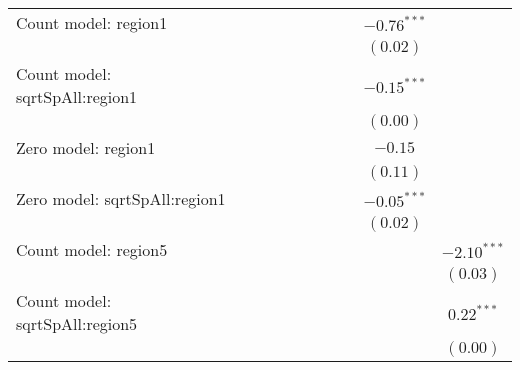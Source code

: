 \begin{center}
\begin{longtable}{l c c c c c c c c c}
Count model: region1           &               &               &               &                 &               &                 &                 & $-0.76^{***}$ &               \\
                               &               &               &               &                 &               &                 &                 & $(0.02)$      &               \\
Count model: sqrtSpAll:region1 &               &               &               &                 &               &                 &                 & $-0.15^{***}$ &               \\
                               &               &               &               &                 &               &                 &                 & $(0.00)$      &               \\
Zero model: region1            &               &               &               &                 &               &                 &                 & $-0.15$       &               \\
                               &               &               &               &                 &               &                 &                 & $(0.11)$      &               \\
Zero model: sqrtSpAll:region1  &               &               &               &                 &               &                 &                 & $-0.05^{***}$ &               \\
                               &               &               &               &                 &               &                 &                 & $(0.02)$      &               \\
Count model: region5           &               &               &               &                 &               &                 &                 &               & $-2.10^{***}$ \\
                               &               &               &               &                 &               &                 &                 &               & $(0.03)$      \\
Count model: sqrtSpAll:region5 &               &               &               &                 &               &                 &                 &               & $0.22^{***}$  \\
                               &               &               &               &                 &               &                 &                 &               & $(0.00)$      \\

\end{longtable}
\end{center}
